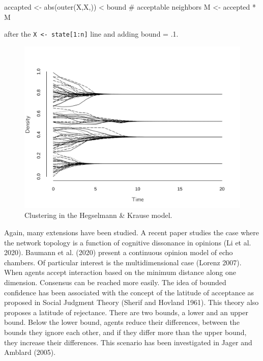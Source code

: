 \documentclass[
  a4paper,
  DIV=11,
  numbers=noendperiod,
  oneside]{scrreprt}
\newenvironment{Shaded}{\begin{snugshade}}{\end{snugshade}}
\newcommand{\CommentTok}[1]{\textcolor[rgb]{0.37,0.37,0.37}{#1}}
\newcommand{\FunctionTok}[1]{\textcolor[rgb]{0.28,0.35,0.67}{#1}}
\newcommand{\NormalTok}[1]{\textcolor[rgb]{0.00,0.23,0.31}{#1}}
\newcommand{\OtherTok}[1]{\textcolor[rgb]{0.00,0.23,0.31}{#1}}
\newcommand{\SpecialCharTok}[1]{\textcolor[rgb]{0.37,0.37,0.37}{#1}}
\newcommand{\StringTok}[1]{\textcolor[rgb]{0.13,0.47,0.30}{#1}}
\begin{document}
\begin{Shaded}
\begin{Highlighting}[]
\NormalTok{accapted }\OtherTok{\textless{}{-}} \FunctionTok{abs}\NormalTok{(}\FunctionTok{outer}\NormalTok{(X,X,}\StringTok{\textquotesingle{}{-}\textquotesingle{}}\NormalTok{)) }\SpecialCharTok{\textless{}}\NormalTok{ bound }\CommentTok{\# acceptable neighbors}
\NormalTok{M }\OtherTok{\textless{}{-}}\NormalTok{ accepted }\SpecialCharTok{*}\NormalTok{ M}
\end{Highlighting}
\end{Shaded}

after the \texttt{X\ \textless{}-\ state{[}1:n{]}} line and adding bound
= .1.

\begin{figure}

{\centering \includegraphics{media/ch7/fig-ch7-img9-old-97.png}

}

\caption{\label{fig-ch7-img9-old-97}Clustering in the Hegselmann \&
Krause model.}

\end{figure}

Again, many extensions have been studied. A recent paper studies the
case where the network topology is a function of cognitive dissonance in
opinions (Li et al. 2020). Baumann et al. (2020) present a continuous
opinion model of echo chambers. Of particular interest is the
multidimensional case (Lorenz 2007). When agents accept interaction
based on the minimum distance along one dimension. Consensus can be
reached more easily. The idea of bounded confidence has been associated
with the concept of the latitude of acceptance as proposed in Social
Judgment Theory (Sherif and Hovland 1961). This theory also proposes a
latitude of rejectance. There are two bounds, a lower and an upper
bound. Below the lower bound, agents reduce their differences, between
the bounds they ignore each other, and if they differ more than the
upper bound, they increase their differences. This scenario has been
investigated in Jager and Amblard (2005).
\end{document}
